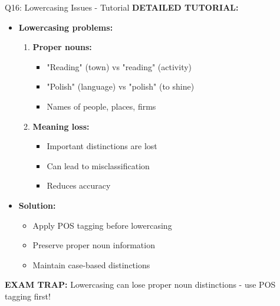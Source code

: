 \documentclass[8pt]{beamer}
\begin{document}
\begin{frame}{Q16: Lowercasing Issues - Tutorial}
		\vspace{0.1cm}
		\textbf{DETAILED TUTORIAL:}
		\begin{itemize}
			\item \textbf{Lowercasing problems:}
			\begin{enumerate}
				\item \textbf{Proper nouns:}
				\begin{itemize}
					\item "Reading" (town) vs "reading" (activity)
					\item "Polish" (language) vs "polish" (to shine)
					\item Names of people, places, firms
				\end{itemize}
				\item \textbf{Meaning loss:}
				\begin{itemize}
					\item Important distinctions are lost
					\item Can lead to misclassification
					\item Reduces accuracy
				\end{itemize}
			\end{enumerate}
			\item \textbf{Solution:}
			\begin{itemize}
				\item Apply POS tagging before lowercasing
				\item Preserve proper noun information
				\item Maintain case-based distinctions
			\end{itemize}
		\end{itemize}
		
		\textcolor{myred}{\textbf{EXAM TRAP:}} Lowercasing can lose \textcolor{myblue}{proper noun distinctions} - use POS tagging first!
	\end{frame}
	
\end{document}

